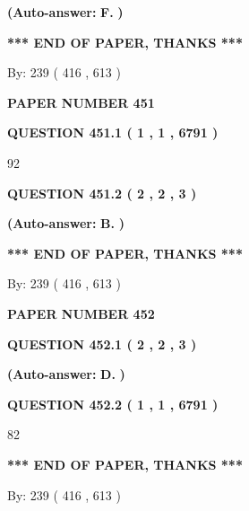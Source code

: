 \documentclass{ctexart}
\begin{document}
 
{\textbf{(Auto-answer:}}
{\textbf{\large{
F.}}}
{\textbf{)}}
 
 
   
   
   
   
\vspace{1.0in} 
{\textbf{\large{ *** END OF PAPER, THANKS *** }}} 
   
   
\hspace{1.0in} By: 
 239 ( 416 ,  613 )
   
   
   
   
\newpage 
\setcounter{page}{ 
   451001 } 
   
   
 {\textbf{ \Large{ PAPER NUMBER  451  }}}
   
   
   
   
  
  
{\textbf{\large{QUESTION
451.1 
 ( 1 , 1 , 6791 )
}}}

92
  
  
{\textbf{\large{QUESTION
451.2 
 ( 2 , 2 , 3 )
}}}
 
 
{\textbf{(Auto-answer:}}
{\textbf{\large{
B.}}}
{\textbf{)}}
 
 
   
   
   
   
\vspace{1.0in} 
{\textbf{\large{ *** END OF PAPER, THANKS *** }}} 
   
   
\hspace{1.0in} By: 
 239 ( 416 ,  613 )
   
   
   
   
\newpage 
\setcounter{page}{ 
   452001 } 
   
   
 {\textbf{ \Large{ PAPER NUMBER  452  }}}
   
   
   
   
  
  
{\textbf{\large{QUESTION
452.1 
 ( 2 , 2 , 3 )
}}}
 
 
{\textbf{(Auto-answer:}}
{\textbf{\large{
D.}}}
{\textbf{)}}
 
 
  
  
{\textbf{\large{QUESTION
452.2 
 ( 1 , 1 , 6791 )
}}}

82
   
   
   
   
\vspace{1.0in} 
{\textbf{\large{ *** END OF PAPER, THANKS *** }}} 
   
   
\hspace{1.0in} By: 
 239 ( 416 ,  613 )
   
   
   
\end{document}
